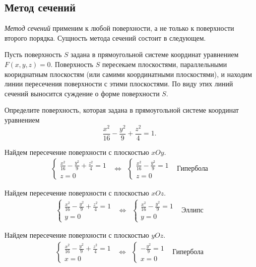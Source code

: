 \subsection*{Метод сечений}

\textit{Метод сечений} применим к любой поверхности, а не только к поверхности второго порядка. Сущность метода сечений состоит в следующем.

Пусть поверхность $S$ задана в прямоугольной системе координат уравнением $F(x, y, z) = 0$. Поверхность $S$ пересекаем плоскостями, параллельными
коориднатным плоскостям (или самими координатными плоскостями), и находим линии пересечения поверхности с этими плоскостями. По виду этих
линий сечений выносится суждение о форме поверхности $S$.

\begin{example}
  Определите поверхность, которая задана в прямоугольной системе координат уравнением $$
    \frac{x^2}{16} - \frac{y^2}{9} + \frac{z^2}{4} = 1.
  $$

  Найдем пересечение поверхности с плоскостью $xOy$.
  $$
  \begin{array}{cccc}
    \begin{cases}
      \frac{x^2}{16} - \frac{y^2}{9} + \frac{z^2}{4} = 1 \\
      z = 0
    \end{cases} &
    \Leftrightarrow &
    \begin{cases}
      \frac{x^2}{16} - \frac{y^2}{9}  = 1 \\
      z = 0
    \end{cases} &
    \text{Гипербола} 
  \end{array}
    $$
    
    Найдем пересечение поверхности с плоскостью $xOz$.
    $$
    \begin{array}{cccc}
      \begin{cases}
        \frac{x^2}{16} - \frac{y^2}{9} + \frac{z^2}{4} = 1 \\
        y = 0
      \end{cases} &
      \Leftrightarrow &
      \begin{cases}
        \frac{x^2}{16} - \frac{y^2}{9}  = 1 \\
        y = 0
      \end{cases} &
      \text{Эллипс} 
    \end{array}
      $$

    Найдем пересечение поверхности с плоскостью $yOz$.
    $$
    \begin{array}{cccc}
      \begin{cases}
        \frac{x^2}{16} - \frac{y^2}{9} + \frac{z^2}{4} = 1 \\
        x = 0
      \end{cases} &
      \Leftrightarrow &
      \begin{cases}
         - \frac{y^2}{9}  = 1 \\
        x = 0
      \end{cases} &
      \text{Гипербола} 
    \end{array}
      $$


\end{example}

